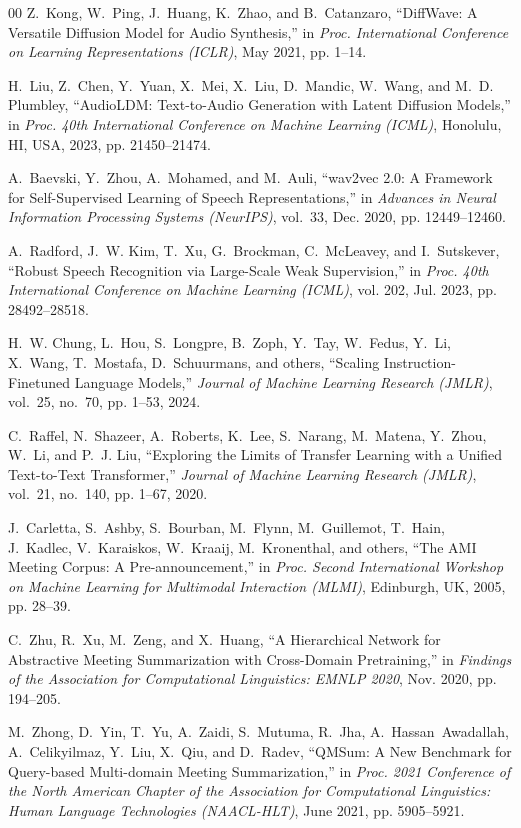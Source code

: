 \documentclass[conference]{IEEEtran}
\begin{document}
\begin{thebibliography}{00}
Z.~Kong, W.~Ping, J.~Huang, K.~Zhao, and B.~Catanzaro, ``DiffWave: A Versatile Diffusion Model for Audio Synthesis,'' in \emph{Proc. International Conference on Learning Representations (ICLR)}, May 2021, pp. 1--14.

H.~Liu, Z.~Chen, Y.~Yuan, X.~Mei, X.~Liu, D.~Mandic, W.~Wang, and M.~D. Plumbley, ``AudioLDM: Text-to-Audio Generation with Latent Diffusion Models,'' in \emph{Proc. 40th International Conference on Machine Learning (ICML)}, Honolulu, HI, USA, 2023, pp. 21450--21474.

A.~Baevski, Y.~Zhou, A.~Mohamed, and M.~Auli, ``wav2vec 2.0: A Framework for Self-Supervised Learning of Speech Representations,'' in \emph{Advances in Neural Information Processing Systems (NeurIPS)}, vol.~33, Dec. 2020, pp. 12449--12460.

A.~Radford, J.~W. Kim, T.~Xu, G.~Brockman, C.~McLeavey, and I.~Sutskever, ``Robust Speech Recognition via Large-Scale Weak Supervision,'' in \emph{Proc. 40th International Conference on Machine Learning (ICML)}, vol. 202, Jul. 2023, pp. 28492--28518.

H.~W. Chung, L.~Hou, S.~Longpre, B.~Zoph, Y.~Tay, W.~Fedus, Y.~Li, X.~Wang, T.~Mostafa, D.~Schuurmans, and others, ``Scaling Instruction-Finetuned Language Models,'' \emph{Journal of Machine Learning Research (JMLR)}, vol.~25, no.~70, pp. 1--53, 2024.

C.~Raffel, N.~Shazeer, A.~Roberts, K.~Lee, S.~Narang, M.~Matena, Y.~Zhou, W.~Li, and P.~J. Liu, ``Exploring the Limits of Transfer Learning with a Unified Text-to-Text Transformer,'' \emph{Journal of Machine Learning Research (JMLR)}, vol.~21, no.~140, pp. 1--67, 2020.

J.~Carletta, S.~Ashby, S.~Bourban, M.~Flynn, M.~Guillemot, T.~Hain, J.~Kadlec, V.~Karaiskos, W.~Kraaij, M.~Kronenthal, and others, ``The AMI Meeting Corpus: A Pre-announcement,'' in \emph{Proc. Second International Workshop on Machine Learning for Multimodal Interaction (MLMI)}, Edinburgh, UK, 2005, pp. 28--39.

C.~Zhu, R.~Xu, M.~Zeng, and X.~Huang, ``A Hierarchical Network for Abstractive Meeting Summarization with Cross-Domain Pretraining,'' in \emph{Findings of the Association for Computational Linguistics: EMNLP 2020}, Nov. 2020, pp. 194--205.

M.~Zhong, D.~Yin, T.~Yu, A.~Zaidi, S.~Mutuma, R.~Jha, A.~Hassan~Awadallah, A.~Celikyilmaz, Y.~Liu, X.~Qiu, and D.~Radev, ``QMSum: A New Benchmark for Query-based Multi-domain Meeting Summarization,'' in \emph{Proc. 2021 Conference of the North American Chapter of the Association for Computational Linguistics: Human Language Technologies (NAACL-HLT)}, June 2021, pp. 5905--5921.


\end{thebibliography}
\end{document}
